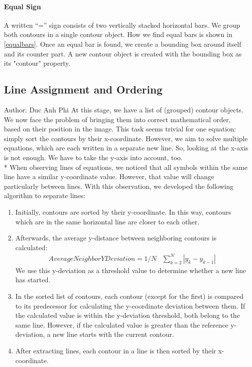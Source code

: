\documentclass[12pt]{article}
\begin{document}
	\paragraph{Equal Sign}
	A written “=” sign consists of two vertically stacked horizontal bars. We group both contours in a single contour object. How we find equal bars is shown in \ref{equalbars}. Once an equal bar is found, we create a bounding box around itself and its counter part.
	A new contour object is created with the bounding box as its "contour" property.
	
	
	\subsection{Line Assignment and Ordering}
	\small{Author: Duc Anh Phi} \newline \newline
	At this stage, we have a list of (grouped) contour objects. We now face the problem of bringing them into correct mathematical order, based on their position in the image.
	This task seems trivial for one equation: simply sort the contours by their x-coordinate.
	However, we aim to solve multiple equations, which are each written in a separate new line.
	So, looking at the x-axis is not enough. We have to take the y-axis into account, too.\\* When observing lines of equations, we noticed that all symbols within the same line have a similar y-coordinate value. However, that value will change particularly between lines. With this observation, we developed the following algorithm to separate lines:
	\\
	\begin{enumerate}
		\item Initially, contours are sorted by their y-coordinate. In this way, contours which are in the same horizontal line are closer to each other.
		\item Afterwards, the average y-distance between neighboring contours is calculated:\\
		\begin{align}
		Average Neighbor Y Deviation = 1/N &\sum\limits_{k=2}^{N} \left|y_{k} - y_{k-1}\right|
		\end{align}
		We use this y-deviation as a threshold value to determine whether a new line has started.
		\item In the sorted list of contours, each contour (except for the first) is compared to its predecessor for calculating the y-coordinate deviation between them. If the calculated value is within the y-deviation threshold, both belong to the same line. However, if the calculated value is greater than the reference y-deviation, a new line starts with the current contour.
		\item After extracting lines, each contour in a line is then sorted by their x-coordinate.
	\end{enumerate}
	
\end{document}
